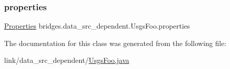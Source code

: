 \hypertarget{classbridges_1_1data__src__dependent_1_1_usgs_foo_a030d83e136f146824b5bda34a4c6fd1c}{}\label{classbridges_1_1data__src__dependent_1_1_usgs_foo_a030d83e136f146824b5bda34a4c6fd1c} 
\subsubsection{\texorpdfstring{properties}{properties}}
{\footnotesize\ttfamily \hyperlink{classbridges_1_1data__src__dependent_1_1_usgs_foo_1_1_properties}{Properties} bridges.\+data\+\_\+src\+\_\+dependent.\+Usgs\+Foo.\+properties}



The documentation for this class was generated from the following file\+:\begin{DoxyCompactItemize}
\item 
link/data\+\_\+src\+\_\+dependent/\hyperlink{_usgs_foo_8java}{Usgs\+Foo.\+java}\end{DoxyCompactItemize}
